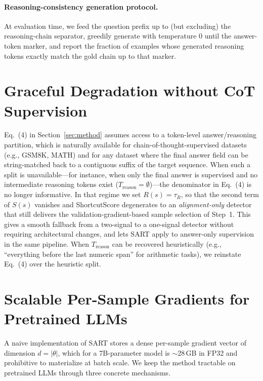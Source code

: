 \paragraph{Reasoning-consistency generation protocol.} At evaluation time, we feed the question prefix up to (but excluding) the reasoning-chain separator, greedily generate with temperature $0$ until the answer-token marker, and report the fraction of examples whose generated reasoning tokens exactly match the gold chain up to that marker.

\section{Graceful Degradation without CoT Supervision}
\label{sec:appendix_graceful}

Eq.~(4) in Section~\ref{sec:method} assumes access to a token-level answer/reasoning partition, which is naturally available for chain-of-thought-supervised datasets (e.g., GSM8K, MATH) and for any dataset where the final answer field can be string-matched back to a contiguous suffix of the target sequence. When such a split is unavailable---for instance, when only the final answer is supervised and no intermediate reasoning tokens exist ($T_{\mathrm{reason}}{=}\emptyset$)---the denominator in Eq.~(4) is no longer informative. In that regime we set $R(s){=}\tau_R$, so that the second term of $S(s)$ vanishes and ShortcutScore degenerates to an \emph{alignment-only} detector that still delivers the validation-gradient-based sample selection of Step~1. This gives a smooth fallback from a two-signal to a one-signal detector without requiring architectural changes, and lets SART apply to answer-only supervision in the same pipeline. When $T_{\mathrm{reason}}$ can be recovered heuristically (e.g., ``everything before the last numeric span'' for arithmetic tasks), we reinstate Eq.~(4) over the heuristic split.

\section{Scalable Per-Sample Gradients for Pretrained LLMs}
\label{sec:scalable_gradients}

A naive implementation of SART stores a dense per-sample gradient vector of dimension $d = |\theta|$, which for a 7B-parameter model is $\sim$28\,GB in FP32 and prohibitive to materialize at batch scale. We keep the method tractable on pretrained LLMs through three concrete mechanisms.

